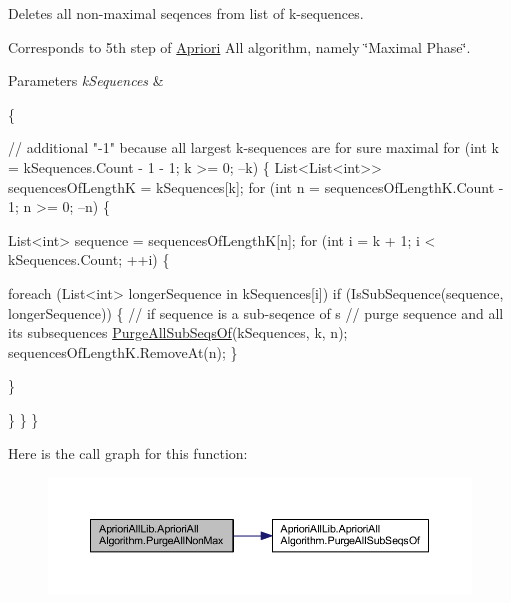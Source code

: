 Deletes all non-\/maximal seqences from list of k-\/sequences. 

Corresponds to 5th step of \hyperlink{class_apriori_all_lib_1_1_apriori}{Apriori} All algorithm, namely \char`\"{}\-Maximal Phase\char`\"{}. 


\begin{DoxyParams}{Parameters}
{\em k\-Sequences} & \\
\hline
\end{DoxyParams}

\begin{DoxyCode}
                                                                             \{

            \textcolor{comment}{// additional "-1" because all largest k-sequences are for sure
       maximal}
            \textcolor{keywordflow}{for} (\textcolor{keywordtype}{int} k = kSequences.Count - 1 - 1; k >= 0; --k) \{
                List<List<int>> sequencesOfLengthK = kSequences[k];
                \textcolor{keywordflow}{for} (\textcolor{keywordtype}{int} n = sequencesOfLengthK.Count - 1; n >= 0; --n) \{

                    List<int> sequence = sequencesOfLengthK[n];
                    \textcolor{keywordflow}{for} (\textcolor{keywordtype}{int} i = k + 1; i < kSequences.Count; ++i) \{

                        \textcolor{keywordflow}{foreach} (List<int> longerSequence \textcolor{keywordflow}{in} kSequences[i])
                            \textcolor{keywordflow}{if} (IsSubSequence(sequence, longerSequence)) \{ \textcolor{comment}{//
       if sequence is a sub-seqence of s}
                                \textcolor{comment}{// purge sequence and all its subsequences}
                                \hyperlink{class_apriori_all_lib_1_1_apriori_all_algorithm_a6a6e8aa1c43b3a71c2eb1d5e068d959a}{PurgeAllSubSeqsOf}(kSequences, 
      k, n);
                                sequencesOfLengthK.RemoveAt(n);
                            \}

                    \}

                \}
            \}
        \}
\end{DoxyCode}


Here is the call graph for this function\-:
\nopagebreak
\begin{figure}[H]
\begin{center}
\leavevmode
\includegraphics[width=350pt]{class_apriori_all_lib_1_1_apriori_all_algorithm_a9f9a1d34d48761a094d3390c2e9d90cd_cgraph}
\end{center}
\end{figure}




